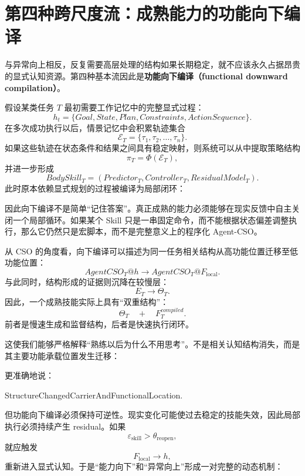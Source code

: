 \section{第四种跨尺度流：成熟能力的功能向下编译}

与异常向上相反，反复需要高层处理的结构如果长期稳定，就不应该永久占据昂贵的显式认知资源。第四种基本流因此是\textbf{功能向下编译（functional downward compilation）}。

假设某类任务 $T$ 最初需要工作记忆中的完整显式过程：
\[
h_t
=
\{
Goal,
State,
Plan,
Constraints,
ActionSequence
\}.
\]
在多次成功执行以后，情景记忆中会积累轨迹集合
\[
\mathcal E_T
=
\{
\tau_1,\tau_2,\ldots,\tau_n
\}.
\]
如果这些轨迹在状态条件和结果之间具有稳定映射，则系统可以从中提取策略结构
\[
\pi_T
=
\Phi(\mathcal E_T),
\]
并进一步形成
\[
BodySkill_T
=
(
Predictor_T,
Controller_T,
ResidualModel_T
).
\]
此时原本依赖显式规划的过程被编译为局部闭环：
\begin{statementbox}
\centering
{}
\end{statementbox}

因此向下编译不是简单“记住答案”。真正成熟的能力必须能够在现实反馈中自主关闭一个局部循环。如果某个 Skill 只是一串固定命令，而不能根据状态偏差调整执行，那么它仍然只是宏脚本，而不是完整意义上的程序化 Agent-CSO。

从 CSO 的角度看，向下编译可以描述为同一任务相关结构从高功能位置迁移至低功能位置：
\[
AgentCSO_T@h
\rightarrow
AgentCSO_T@F_{\mathrm{local}}.
\]
与此同时，结构形成的证据则沉降在较慢层：
\[
E_T
\rightarrow
\Theta_T.
\]
因此，一个成熟技能实际上具有“双重结构”：
\[
\Theta_T
\quad+\quad
F^{compiled}_T.
\]
前者是慢速生成和监督结构，后者是快速执行闭环。

这使我们能够严格解释“熟练以后为什么不用思考”。不是相关认知结构消失，而是其主要功能承载位置发生迁移：
\begin{statementbox}
\centering
{}
\end{statementbox}
更准确地说：
\begin{statementbox}
StructureChangedCarrierAndFunctionalLocation.
\end{statementbox}

但功能向下编译必须保持可逆性。现实变化可能使过去稳定的技能失效，因此局部执行必须持续产生 residual。如果
\[
\varepsilon_{\mathrm{skill}}
>
\theta_{\mathrm{reopen}},
\]
就应触发
\[
F_{\mathrm{local}}
\rightarrow
h,
\]
重新进入显式认知。于是“能力向下”和“异常向上”形成一对完整的动态机制：
\begin{statementbox}
\centering
{}
\end{statementbox}

